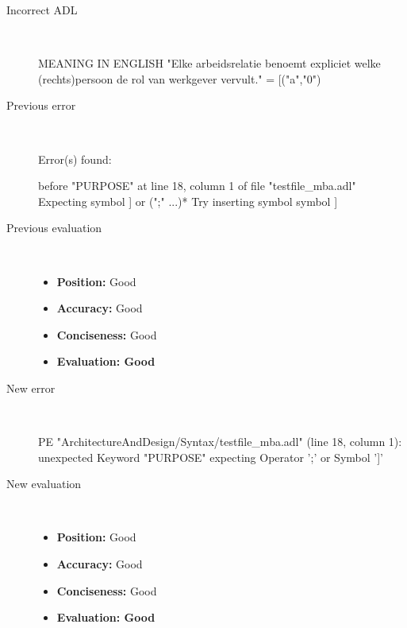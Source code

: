 \hrulefill

\begin{description}
  \item[Incorrect ADL]~\\
\begin{adl}
MEANING IN ENGLISH "Elke arbeidsrelatie benoemt expliciet welke (rechts)persoon de rol van werkgever vervult."
= [("a","0")\end{adl}
  \item[Previous error]~\\
\begin{haskell}
Error(s) found:

before "PURPOSE" at line 18, column 1 of file "testfile_mba.adl"
Expecting symbol ] or (";" ...)*
Try inserting symbol symbol ]

\end{haskell}
  \item[Previous evaluation]~\\
    \begin{itemize}
    \item \textbf{Position:} Good
    \item \textbf{Accuracy:} Good
    \item \textbf{Conciseness:} Good
    \item \textbf{Evaluation: Good}
    \end{itemize}
  \item[New error]~\\
\begin{haskell}
PE "ArchitectureAndDesign/Syntax/testfile_mba.adl" (line 18, column 1):
unexpected Keyword "PURPOSE"
expecting Operator ';' or Symbol ']'\end{haskell}
  \item[New evaluation]~\\
    \begin{itemize}
    \item \textbf{Position:} Good
    \item \textbf{Accuracy:} Good
    \item \textbf{Conciseness:} Good
    \item \textbf{Evaluation: Good}
    \end{itemize}
  \end{description}

\hrulefill

